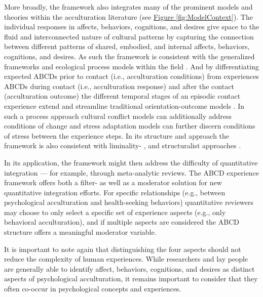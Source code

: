 \documentclass[man, 12pt, a4paper, mask]{apa7}
\newcommand{\fgrref}[2][]{\hyperref[#2]{Figure \ref*{#2}#1}}
\begin{document}
More broadly, the framework also integrates many of the prominent models and theories within the acculturation literature (see \fgrref{fig:ModelContext}). The individual responses in affects, behaviors, cognitions, and desires give space to the fluid and interconnected nature of cultural patterns by capturing the connection between different patterns of shared, embodied, and internal affects, behaviors, cognitions, and desires. As such the framework is consistent with the generalized frameworks \citep[e.g.,][]{Berry2005, Cross1991} and ecological process models within the field \citep[e.g.,][]{Ward2016, Serdarevic2005, Mistry2010}. And by differentiating expected ABCDs prior to contact (i.e., acculturation conditions) from experiences ABCDs during contact (i.e., acculturation response) and after the contact (acculturation outcome) the different temporal stages of an episodic contact experience extend and streamline traditional orientation-outcome models \citep[e.g.,][]{Arends-Toth2006a, TeLindert2008a}. In such a process approach cultural conflict models can additionally address conditions of change \citep[e.g.,][]{Robinson2019} and stress adaptation models can further discern conditions of stress \citep[e.g.,][]{Kim1988, Hajro2019, Sam2006b} between the experience steps. In its structure and approach the framework is also consistent with liminality- \citep[e.g.,][]{Loon2021, Baird2015}, and structuralist approaches \citep[e.g.,][]{Kemppainen2020}.

In its application, the framework might then address the difficulty of quantitative integration --- for example, through meta-analytic reviews. The ABCD experience framework offers both a filter- as well as a moderator solution for new quantitative integration efforts. For specific relationships (e.g., between psychological acculturation and health-seeking behaviors) quantitative reviewers may choose to only select a specific set of experience aspects (e.g., only behavioral acculturation), and if multiple aspects are considered the ABCD structure offers a meaningful moderator variable. 

It is important to note again that distinguishing the four aspects should not reduce the complexity of human experiences. While researchers and lay people are generally able to identify affect, behaviors, cognitions, and desires as distinct aspects of psychological acculturation, it remains important to consider that they often co-occur in psychological concepts and experiences.
\end{document}
